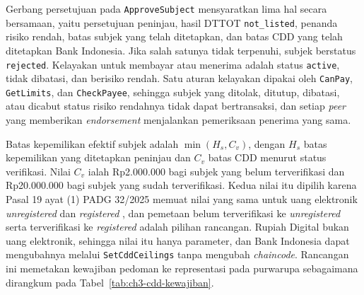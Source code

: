 Gerbang persetujuan pada \texttt{ApproveSubject} mensyaratkan lima hal secara bersamaan, yaitu persetujuan peninjau, hasil DTTOT \texttt{not\_listed}, penanda risiko rendah, batas subjek yang telah ditetapkan, dan batas CDD yang telah ditetapkan Bank Indonesia. Jika salah satunya tidak terpenuhi, subjek berstatus \texttt{rejected}. Kelayakan untuk membayar atau menerima adalah status \texttt{active}, tidak dibatasi, dan berisiko rendah. Satu aturan kelayakan dipakai oleh \texttt{CanPay}, \texttt{GetLimits}, dan \texttt{CheckPayee}, sehingga subjek yang ditolak, ditutup, dibatasi, atau dicabut status risiko rendahnya tidak dapat bertransaksi, dan setiap \textit{peer} yang memberikan \textit{endorsement} menjalankan pemeriksaan penerima yang sama.

Batas kepemilikan efektif subjek adalah $\min(H_{s}, C_{v})$, dengan $H_{s}$ batas kepemilikan yang ditetapkan peninjau dan $C_{v}$ batas CDD menurut status verifikasi. Nilai $C_{v}$ ialah Rp2.000.000 bagi subjek yang belum terverifikasi dan Rp20.000.000 bagi subjek yang sudah terverifikasi. Kedua nilai itu dipilih karena Pasal 19 ayat (1) PADG 32/2025 memuat nilai yang sama untuk uang elektronik \textit{unregistered} dan \textit{registered} \cite{bi2025padg32}, dan pemetaan belum terverifikasi ke \textit{unregistered} serta terverifikasi ke \textit{registered} adalah pilihan rancangan. Rupiah Digital bukan uang elektronik, sehingga nilai itu hanya parameter, dan Bank Indonesia dapat mengubahnya melalui \texttt{SetCddCeilings} tanpa mengubah \textit{chaincode}. Rancangan ini memetakan kewajiban pedoman ke representasi pada purwarupa sebagaimana dirangkum pada Tabel~\ref{tab:ch3-cdd-kewajiban}.

